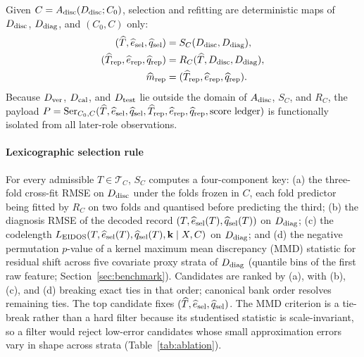 Given \(C=A_{\rm disc}(D_{\rm disc};C_0)\), selection and refitting are deterministic maps of \(D_{\rm disc}\), \(D_{\rm diag}\), and \((C_0,C)\) only:
\begin{equation}\label{eq:selectionmap}
\begin{aligned}
(\widehat T,\widehat e_{\rm sel},\widehat q_{\rm sel})&=S_C(D_{\rm disc},D_{\rm diag}),\\
(\widehat T_{\rm rep},\widehat e_{\rm rep},\widehat q_{\rm rep})&=R_C(\widehat T,D_{\rm disc},D_{\rm diag}),\\
\widehat m_{\rm rep}&=(\widehat T_{\rm rep},\widehat e_{\rm rep},\widehat q_{\rm rep}).
\end{aligned}
\end{equation}
Because \(D_{\rm ver}\), \(D_{\rm cal}\), and \(D_{\rm test}\) lie outside the domain of \(A_{\rm disc}\), \(S_C\), and \(R_C\), the payload \(P=\operatorname{Ser}_{C_0,C}(\widehat T,\allowbreak\widehat e_{\rm sel},\allowbreak\widehat q_{\rm sel},\allowbreak\widehat T_{\rm rep},\allowbreak\widehat e_{\rm rep},\allowbreak\widehat q_{\rm rep},\allowbreak\text{score ledger})\) is functionally isolated from all later-role observations.

\paragraph{Lexicographic selection rule} For every admissible \(T\in\mathcal T_C\), \(S_C\) computes a four-component key: (a) the three-fold cross-fit RMSE on \(D_{\rm disc}\) under the folds frozen in \(C\), each fold predictor being fitted by \(R_C\) on two folds and quantised before predicting the third; (b) the diagnosis RMSE of the decoded record \((T,\widehat e_{\rm sel}(T),\widehat q_{\rm sel}(T))\) on \(D_{\rm diag}\); (c) the codelength \(L_{\mathrm{EIDOS}}(T,\widehat e_{\rm sel}(T),\widehat q_{\rm sel}(T),\mathbf k\mid X,C)\) on \(D_{\rm diag}\); and (d) the negative permutation \(p\)-value of a kernel maximum mean discrepancy (MMD) statistic for residual shift across five covariate proxy strata of \(D_{\rm diag}\) (quantile bins of the first raw feature; Section~\ref{sec:benchmark}). Candidates are ranked by (a), with (b), (c), and (d) breaking exact ties in that order; canonical bank order resolves remaining ties. The top candidate fixes \((\widehat T,\widehat e_{\rm sel},\widehat q_{\rm sel})\). The MMD criterion is a tie-break rather than a hard filter because its studentised statistic is scale-invariant, so a filter would reject low-error candidates whose small approximation errors vary in shape across strata (Table~\ref{tab:ablation}).

